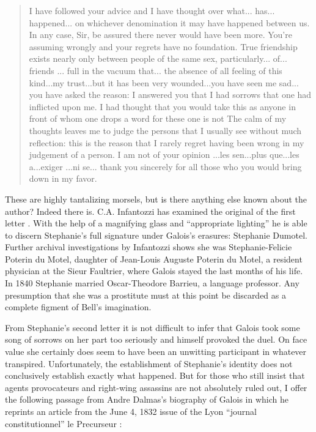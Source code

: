 \documentclass[12pt]{article}
\begin{document}
\begin{quote}
I have followed your advice and I have thought over what... has... happened... on whichever denomination it may have happened between us. In any case, Sir, be assured there never would have been more. You're assuming wrongly and your regrets have no foundation. True friendship exists nearly only between people of the same sex, particularly... of... friends ... full in the vacuum that... the absence of all feeling of this kind...my trust...but it has been very wounded...you have seen me sad... you have asked the reason: I answered you that I had sorrows that one had inflicted upon me. I had thought that you would take this as anyone in front of whom one drops a word for these one is not The calm of my thoughts leaves me to judge the persons that I usually see without much reflection: this is the reason that I rarely regret having been wrong in my judgement of a person. I am not of your opinion ...les sen...plus que...les a...exiger ...ni se... thank you sincerely for all those who you would bring down in my favor.
\end{quote}
These are highly tantalizing morsels, but is there anything else known about the author? Indeed there is. C.A. Infantozzi has examined the original of the first letter \cite{92}. With the help of a magnifying glass and ``appropriate lighting'' he is able to discern Stephanie's full signature under Galois's erasures: Stephanie Dumotel. Further archival investigations by Infantozzi shows she was Stephanie-Felicie Poterin du Motel, daughter of Jean-Louis Auguste Poterin du Motel, a resident physician at the Sieur Faultrier, where Galois stayed the last months of his life. In 1840 Stephanie married Oscar-Theodore Barrieu, a language professor. Any presumption that she was a prostitute must at this point be discarded as a complete figment of Bell's imagination.

From Stephanie's second letter it is not difficult to infer that Galois took some song of sorrows on her part too seriously and himself provoked the duel. On face value she certainly does seem to have been an unwitting participant in whatever transpired. 
Unfortunately, the establishment of Stephanie's identity does not conclusively establish exactly what happened. But for those who still insist that agents provocateurs and right-wing assassins are not absolutely ruled out, I offer the following passage from Andre Dalmas's biography of Galois in which he reprints an article from the June 4, 1832 issue of the Lyon ``journal constitutionnel'' le Precurseur \cite{93}:
\end{document}
